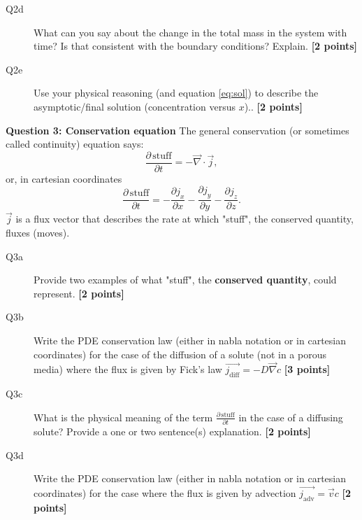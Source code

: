 \documentclass{article}
\begin{document}
\begin{description}
\item [Q2d] What can you say about the change in the total mass in the system with time? Is that consistent with the boundary conditions? Explain. \textbf{[2 points]}
\vspace{2cm}

\item [Q2e] Use your physical reasoning (and equation \ref{eq:sol}) to describe the asymptotic/final solution (concentration versus $x$).. \textbf{[2 points]}
\vspace{2cm}

\end{description}

\textbf{Question 3: Conservation equation}
The general conservation (or sometimes called continuity) equation says:
\begin{equation}
\frac{\partial \, \mathrm{stuff}}{\partial t} = - \overrightarrow{\nabla } \cdot\overrightarrow{j},
\end{equation} or, in cartesian coordinates
\begin{equation}
\frac{\partial \, \mathrm{stuff}}{\partial t} = - \frac{\partial j_x}{\partial x} - \frac{\partial j_y}{\partial y} - \frac{\partial j_z}{\partial z}.
\end{equation} $ \overrightarrow{j} $ is a flux vector that describes the rate at which "stuff", the conserved quantity, fluxes (moves).


\begin{description}
\item [Q3a] Provide two examples of what "stuff", the \textbf{conserved quantity}, could represent. \textbf{[2 points]}
\vspace{2.5cm}

\item [Q3b] Write the PDE conservation law (either in nabla notation or in cartesian coordinates) for the case of the diffusion of a solute (not in a porous media) where the flux is given by Fick's law $ \overrightarrow{j_{\mathrm{diff}}} = - D \overrightarrow{\nabla} c$ \textbf{[3 points]}
\vspace{2.5cm}


\item [Q3c] What is the physical meaning of the term $\frac{\partial \, \mathrm{stuff}}{\partial t}$ in the case of a diffusing solute? Provide a one or two sentence(s) explanation. \textbf{[2 points]}
\vspace{2.5cm}

\item [Q3d] Write the PDE conservation law (either in nabla notation or in cartesian coordinates) for the case where the flux is given by advection $ \overrightarrow{j_{\mathrm{adv}}} = \overrightarrow{v} c$ \textbf{[2 points]}
\vspace{2.5cm}

\end{description}
\end{document}
